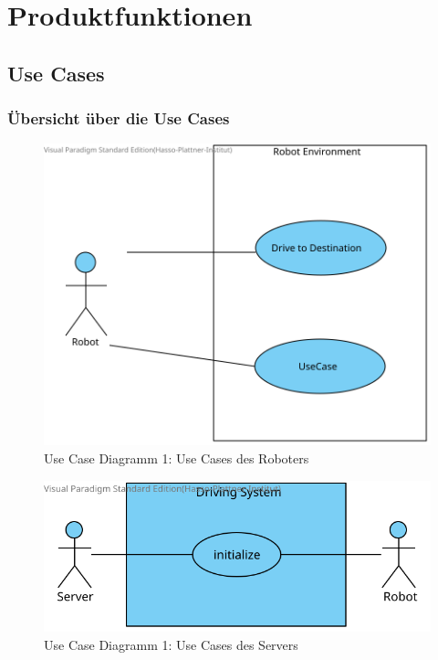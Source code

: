 \documentclass[includeheaders]{scrartcl}
\begin{document}
	\pagebreak

	\section{Produktfunktionen}

		\subsection{Use Cases}
		
		\subsubsection{Übersicht über die Use Cases}
		
			\begin{figure}[H]
				\centering
				\includegraphics[width=\textwidth]{../images/Iteration0_Analyse_3-1_driveToDestinationUseCase.svg}
				\caption{Use Case Diagramm 1: Use Cases des Roboters}
				\label{fig:3-1-robot-use-cases}
			\end{figure}

			\begin{figure}[H]
				\centering
				\includegraphics[width=\textwidth]{../images/Iteration0_Analyse_3-1_DrivingSystem.svg}
				\caption{Use Case Diagramm 1: Use Cases des Servers}
				\label{fig:3-1-server-use-cases}
			\end{figure}
\end{document}
